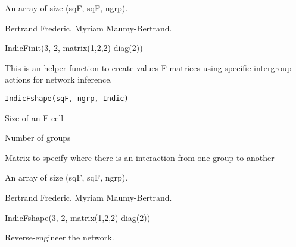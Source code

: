 \documentclass[a4paper]{book}
\begin{document}
%
\begin{Value}
An array of size (sqF, sqF, ngrp).
\end{Value}
%
\begin{Author}\relax
Bertrand Frederic, Myriam Maumy-Bertrand.
\end{Author}
%
\begin{Examples}
\begin{ExampleCode}
IndicFinit(3, 2, matrix(1,2,2)-diag(2))
\end{ExampleCode}
\end{Examples}
%
\begin{Description}\relax
This is an helper function to create values F matrices using specific intergroup actions for network inference.
\end{Description}
%
\begin{Usage}
\begin{verbatim}
IndicFshape(sqF, ngrp, Indic)
\end{verbatim}
\end{Usage}
%
\begin{Arguments}
\begin{ldescription}
\item[\code{sqF}] Size of an F cell
\item[\code{ngrp}] Number of groups
\item[\code{Indic}] Matrix to specify where there is an interaction from one group to another
\end{ldescription}
\end{Arguments}
%
\begin{Value}
An array of size (sqF, sqF, ngrp).
\end{Value}
%
\begin{Author}\relax
Bertrand Frederic, Myriam Maumy-Bertrand.
\end{Author}
%
\begin{Examples}
\begin{ExampleCode}
IndicFshape(3, 2, matrix(1,2,2)-diag(2))
\end{ExampleCode}
\end{Examples}
%
\begin{Description}\relax
Reverse-engineer the network.
\end{Description}
\end{document}

